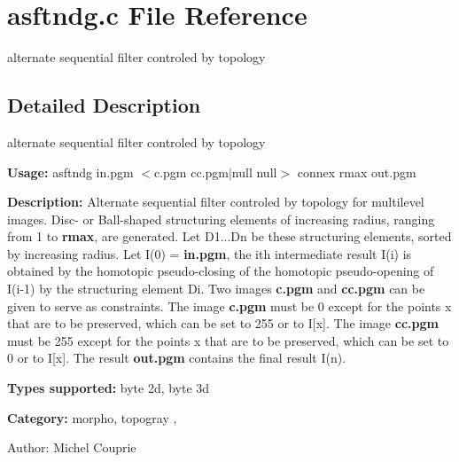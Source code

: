 \section{asftndg.c File Reference}
\label{asftndg_8c}
alternate sequential filter controled by topology 



\subsection{Detailed Description}
alternate sequential filter controled by topology 

{\bf Usage:} asftndg in.pgm $<$c.pgm cc.pgm$|$null null$>$ connex rmax out.pgm

{\bf Description:} Alternate sequential filter controled by topology for multilevel images. Disc- or Ball-shaped structuring elements of increasing radius, ranging from 1 to {\bf rmax}, are generated. Let D1...Dn be these structuring elements, sorted by increasing radius. Let I(0) = {\bf in.pgm}, the ith intermediate result I(i) is obtained by the homotopic pseudo-closing of the homotopic pseudo-opening of I(i-1) by the structuring element Di. Two images {\bf c.pgm} and {\bf cc.pgm} can be given to serve as constraints. The image {\bf c.pgm} must be 0 except for the points x that are to be preserved, which can be set to 255 or to I[x]. The image {\bf cc.pgm} must be 255 except for the points x that are to be preserved, which can be set to 0 or to I[x]. The result {\bf out.pgm} contains the final result I(n).

{\bf Types supported:} byte 2d, byte 3d

{\bf Category:} morpho, topogray ,

\begin{Desc}
\item[Author:]Michel Couprie \end{Desc}
